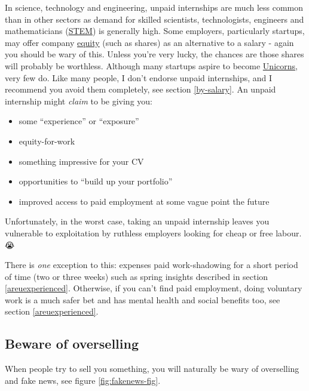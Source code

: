 \documentclass[
]{book}
\providecommand{\tightlist}{%
  \setlength{\itemsep}{0pt}\setlength{\parskip}{0pt}}
\begin{document}
In science, technology and engineering, unpaid internships are much less common than in other sectors as demand for skilled scientists, technologists, engineers and mathematicians (\href{https://en.wikipedia.org/wiki/Science,_technology,_engineering,_and_mathematics}{STEM}) is generally high. Some employers, particularly startups, may offer company \href{https://en.wikipedia.org/wiki/Equity_(finance)}{equity} (such as shares) as an alternative to a salary - again you should be wary of this. Unless you're very lucky, the chances are those shares will probably be worthless. Although many startups aspire to become \href{https://en.wikipedia.org/wiki/Unicorn_(finance)}{Unicorns}, very few do. Like many people, I don't endorse unpaid internships, and I recommend you avoid them completely, see section \ref{by-salary}. An unpaid internship might \emph{claim} to be giving you:

\begin{itemize}
\tightlist
\item
  some ``experience'' or ``exposure''
\item
  equity-for-work
\item
  something impressive for your CV
\item
  opportunities to ``build up your portfolio''
\item
  improved access to paid employment at some vague point the future
\end{itemize}

Unfortunately, in the worst case, taking an unpaid internship leaves you vulnerable to exploitation by ruthless employers looking for cheap or free labour. 😭

There is \emph{one} exception to this: expenses paid work-shadowing for a short period of time (two or three weeks) such as spring insights described in section \ref{areuexperienced}. Otherwise, if you can't find paid employment, doing voluntary work is a much safer bet and has mental health and social benefits too, see section \ref{areuexperienced}.

\hypertarget{oversell}{%
\subsection{Beware of overselling}\label{oversell}}

When people try to sell you something, you will naturally be wary of overselling and fake news, see figure \ref{fig:fakenews-fig}.
\end{document}
